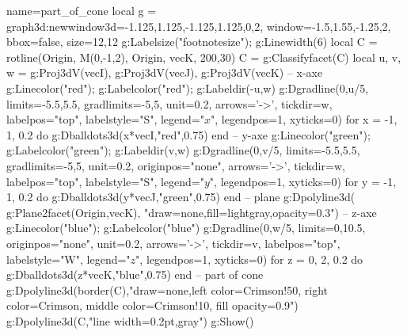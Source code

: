 \documentclass[border=5pt]{standalone}%
\begin{document}
\begin{luadraw}{name=part_of_cone}
local g = graph3d:new{window3d={-1.125,1.125,-1.125,1.125,0,2}, window={-1.5,1.55,-1.25,2}, bbox=false, size={12,12}} 
g:Labelsize("footnotesize"); g:Linewidth(6)
local C = rotline({Origin, M(0,-1,2)}, {Origin, vecK}, 200,30)
C = g:Classifyfacet(C)
local u, v, w = g:Proj3dV(vecI), g:Proj3dV(vecJ), g:Proj3dV(vecK)
--  x-axe
g:Linecolor("red"); g:Labelcolor("red"); g:Labeldir({-u,w})
g:Dgradline({0,u/5}, {limits={-5.5,5.5}, gradlimits={-5,5}, unit=0.2, arrows='->', tickdir=w, labelpos="top", labelstyle="S", legend="$x$", legendpos=1, xyticks=0})
for x = -1, 1, 0.2 do g:Dballdots3d(x*vecI,"red",0.75) end
-- y-axe
g:Linecolor("green"); g:Labelcolor("green"); g:Labeldir({v,w})
g:Dgradline({0,v/5}, {limits={-5.5,5.5}, gradlimits={-5,5}, unit=0.2,  originpos="none", arrows='->', tickdir=w, labelpos="top", labelstyle="S", legend="$y$", legendpos=1, xyticks=0})
for y = -1, 1, 0.2 do g:Dballdots3d(y*vecJ,"green",0.75) end
-- plane
g:Dpolyline3d( g:Plane2facet({Origin,vecK}), "draw=none,fill=lightgray,opacity=0.3")
-- z-axe
g:Linecolor("blue"); g:Labelcolor("blue")
g:Dgradline({0,w/5}, {limits={0,10.5}, originpos="none", unit=0.2, arrows='->', tickdir=v, labelpos="top", labelstyle="W", legend="$z$", legendpos=1, xyticks=0})
for z = 0, 2, 0.2 do g:Dballdots3d(z*vecK,"blue",0.75) end
-- part of cone
g:Dpolyline3d(border(C),"draw=none,left color=Crimson!50, right color=Crimson, middle color=Crimson!10, fill opacity=0.9")
g:Dpolyline3d(C,"line width=0.2pt,gray")
g:Show()
\end{luadraw}
\end{document}
